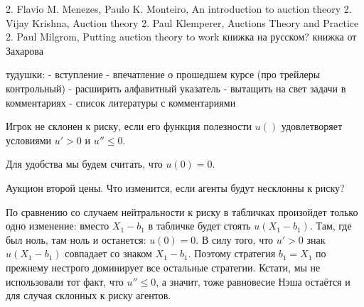 2.	Flavio M. Menezes, Paulo K. Monteiro, An introduction to auction theory
2.	Vijay Krishna, Auction theory
2.	Paul Klemperer, Auctions Theory and Practice
2.	Paul Milgrom, Putting auction theory to work
книжка на русском?
книжка от Захарова

тудушки:
- вступление
- впечатление о прошедшем курсе (про трейлеры контрольный)
- расширить алфавитный указатель
- вытащить на свет задачи в комментариях
- список литературы с комментариями


\begin{mydef}
Игрок не склонен к риску, если его функция полезности $ u() $ удовлетворяет условиями $ u'>0 $ и $ u''\leq 0 $.
\end{mydef}

Для удобства мы будем считать, что $ u(0)=0 $.

Аукцион второй цены. Что изменится, если агенты будут несклонны к риску?

По сравнению со случаем нейтральности к риску в табличках произойдет только одно изменение: вместо $ X_{1}-b_{1} $ в табличке будет стоять $ u(X_{1}-b_{1}) $. Там, где был ноль, там ноль и останется: $ u(0)=0 $. В силу того, что $ u'>0 $ знак $ u(X_{1}-b_{1}) $ совпадает со знаком $ X_{1}-b_{1} $. Поэтому стратегия $ b_{1}=X_{1} $ по прежнему нестрого доминирует все остальные стратегии. Кстати, мы не использовали  тот факт, что $u''\leq 0 $, а значит, тоже равновесие Нэша остаётся и для случая склонных к риску агентов.









